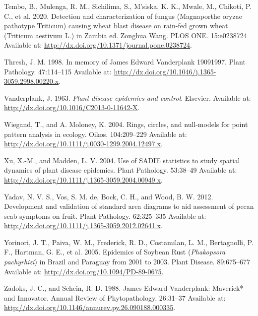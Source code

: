 \documentclass[
  letterpaper,
  DIV=11,
  numbers=noendperiod]{scrreprt}
\newlength{\cslhangindent}
\newlength{\cslentryspacingunit} %
\newenvironment{CSLReferences}[2] %
 {%
  \setlength{\parindent}{0pt}
  \ifodd #1
  \let\oldpar\par
  \def\par{\hangindent=\cslhangindent\oldpar}
  \fi
  \setlength{\parskip}{#2\cslentryspacingunit}
 }%
 {}
\begin{document}
\begin{CSLReferences}{0}{0}
\leavevmode{}%
Tembo, B., Mulenga, R. M., Sichilima, S., M'siska, K. K., Mwale, M.,
Chikoti, P. C., et al. 2020. Detection and characterization of fungus
(Magnaporthe oryzae pathotype Triticum) causing wheat blast disease on
rain-fed grown wheat (Triticum aestivum L.) in Zambia ed. Zonghua Wang.
PLOS ONE. 15:e0238724 Available at:
\url{http://dx.doi.org/10.1371/journal.pone.0238724}.

\leavevmode{}%
Thresh, J. M. 1998. In memory of James Edward Vanderplank
1909{\textendash}1997. Plant Pathology. 47:114--115 Available at:
\url{http://dx.doi.org/10.1046/j.1365-3059.2998.00220.x}.

\leavevmode{}%
Vanderplank, J. 1963. \emph{Plant disease epidemics and control}.
Elsevier. Available at: \url{http://dx.doi.org/10.1016/C2013-0-11642-X}.

\leavevmode{}%
Wiegand, T., and A. Moloney, K. 2004. Rings, circles, and null-models
for point pattern analysis in ecology. Oikos. 104:209--229 Available at:
\url{http://dx.doi.org/10.1111/j.0030-1299.2004.12497.x}.

\leavevmode{}%
Xu, X.-M., and Madden, L. V. 2004. Use of {SADIE} statistics to study
spatial dynamics of plant disease epidemics. Plant Pathology. 53:38--49
Available at: \url{http://dx.doi.org/10.1111/j.1365-3059.2004.00949.x}.

\leavevmode{}%
Yadav, N. V. S., Vos, S. M. de, Bock, C. H., and Wood, B. W. 2012.
Development and validation of standard area diagrams to aid assessment
of pecan scab symptoms on fruit. Plant Pathology. 62:325--335 Available
at: \url{http://dx.doi.org/10.1111/j.1365-3059.2012.02641.x}.

\leavevmode{}%
Yorinori, J. T., Paiva, W. M., Frederick, R. D., Costamilan, L. M.,
Bertagnolli, P. F., Hartman, G. E., et al. 2005. Epidemics of Soybean
Rust ({\emph{Phakopsora pachyrhizi}}) in Brazil and Paraguay from 2001
to 2003. Plant Disease. 89:675--677 Available at:
\url{http://dx.doi.org/10.1094/PD-89-0675}.

\leavevmode{}%
Zadoks, J. C., and Schein, R. D. 1988. James Edward Vanderplank:
Maverick* and Innovator. Annual Review of Phytopathology. 26:31--37
Available at:
\url{http://dx.doi.org/10.1146/annurev.py.26.090188.000335}.

\end{CSLReferences}
\end{document}
